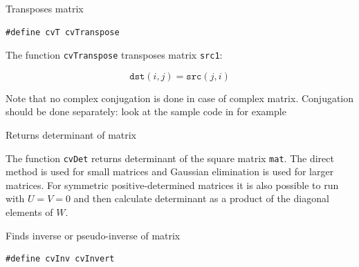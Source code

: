 Transposes matrix


\begin{lstlisting}
#define cvT cvTranspose
\end{lstlisting}

\begin{description}
\end{description}

The function \texttt{cvTranspose} transposes matrix \texttt{src1}:

\[ \texttt{dst}(i,j) = \texttt{src}(j,i) \]

Note that no complex conjugation is done in case of complex
matrix. Conjugation should be done separately: look at the sample code
in  for example

\label{Det}

Returns determinant of matrix


\begin{description}
\end{description}

The function \texttt{cvDet} returns determinant of the square matrix \texttt{mat}. The direct method is used for small matrices and Gaussian elimination is used for larger matrices. For symmetric positive-determined matrices it is also possible to run
with $U = V = 0$ and then calculate determinant as a product of the diagonal elements of $W$.

\label{Invert}

Finds inverse or pseudo-inverse of matrix

\begin{lstlisting}
#define cvInv cvInvert
\end{lstlisting}

\begin{description}
\end{description}


